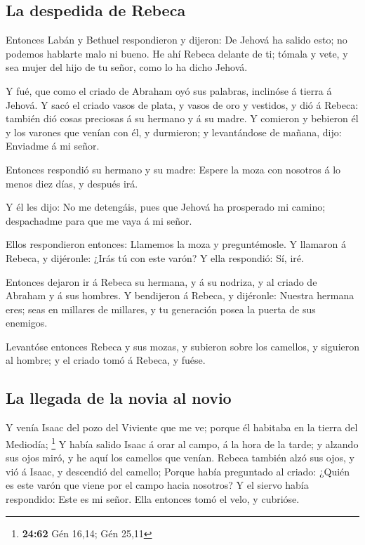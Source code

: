 \hypertarget{la-despedida-de-rebeca}{%
\subsection{La despedida de Rebeca}\label{la-despedida-de-rebeca}}

 Entonces Labán y Bethuel respondieron y dijeron: De Jehová
ha salido esto; no podemos hablarte malo ni bueno.  He ahí
Rebeca delante de ti; tómala y vete, y sea mujer del hijo de tu señor,
como lo ha dicho Jehová.

 Y fué, que como el criado de Abraham oyó sus palabras,
inclinóse á tierra á Jehová.  Y sacó el criado vasos de
plata, y vasos de oro y vestidos, y dió á Rebeca: también dió cosas
preciosas á su hermano y á su madre.  Y comieron y bebieron
él y los varones que venían con él, y durmieron; y levantándose de
mañana, dijo: Enviadme á mi señor.

 Entonces respondió su hermano y su madre: Espere la moza
con nosotros á lo menos diez días, y después irá.

 Y él les dijo: No me detengáis, pues que Jehová ha
prosperado mi camino; despachadme para que me vaya á mi señor.

 Ellos respondieron entonces: Llamemos la moza y
preguntémosle.  Y llamaron á Rebeca, y dijéronle: ¿Irás tú
con este varón? Y ella respondió: Sí, iré.

 Entonces dejaron ir á Rebeca su hermana, y á su nodriza, y
al criado de Abraham y á sus hombres.  Y bendijeron á
Rebeca, y dijéronle: Nuestra hermana eres; seas en millares de millares,
y tu generación posea la puerta de sus enemigos.

 Levantóse entonces Rebeca y sus mozas, y subieron sobre
los camellos, y siguieron al hombre; y el criado tomó á Rebeca, y fuése.

\hypertarget{la-llegada-de-la-novia-al-novio}{%
\subsection{La llegada de la novia al
novio}\label{la-llegada-de-la-novia-al-novio}}

 Y venía Isaac del pozo del Viviente que me ve; porque él
habitaba en la tierra del Mediodía; \footnote{\textbf{24:62} Gén 16,14;
  Gén 25,11}  Y había salido Isaac á orar al campo, á la
hora de la tarde; y alzando sus ojos miró, y he aquí los camellos que
venían.  Rebeca también alzó sus ojos, y vió á Isaac, y
descendió del camello;  Porque había preguntado al criado:
¿Quién es este varón que viene por el campo hacia nosotros? Y el siervo
había respondido: Este es mi señor. Ella entonces tomó el velo, y
cubrióse.

